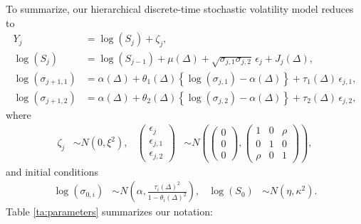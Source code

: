 \documentclass[10pt]{article}
\begin{document}
To summarize, our hierarchical discrete-time stochastic volatility model reduces to
\begin{align}
  Y_j &= \log(S_j) + \zeta_j  ,   \label{eq:mod1}   \\
  \log(S_{j}) &= \log(S_{j-1}) + \mu(\Delta) + \sqrt{\sigma_{j,1}\sigma_{j,2}} \, \epsilon_{j} + J_j(\Delta)   ,  \label{eq:mod2}  \\
  \log(\sigma_{j+1,1}) &= \alpha(\Delta) + \theta_1(\Delta) \left\{ \log(\sigma_{j,1}) - \alpha(\Delta) \right\} + \tau_1(\Delta) \, \epsilon_{j,1}    ,  \label{eq:mod3}  \\
  \log(\sigma_{j+1,2}) &= \alpha(\Delta) + \theta_2(\Delta) \left\{ \log(\sigma_{j,2}) - \alpha(\Delta) \right\} + \tau_2(\Delta) \, \epsilon_{j,2}    , \label{eq:mod4}
\end{align}
where
\begin{align*}
  \zeta_j &\sim N(0, \xi^2)  ,  &
                                  \left( \begin{matrix} \epsilon_{j} \\
      \epsilon_{j,1} \\ \epsilon_{j,2} \end{matrix} \right) &\sim
                                            N \left( \left(\begin{matrix} 0 \\ 0 \\
	                                          0 \end{matrix}
                                              \right) ,
  \left( \begin{matrix} 1 & 0 & \rho \\
      0 & 1 & 0 \\
    \rho & 0 & 1 \end{matrix} \right) \right)  ,
\end{align*}
and initial conditions
\begin{align*}
  \log(\sigma_{0,i}) & \sim N \left( \alpha , \frac{\tau_i(\Delta)^2}{1 - \theta_i(\Delta)^2} \right)  ,  &   \log(S_0) & \sim N \left( \eta, \kappa^2 \right)  .
\end{align*}
Table \ref{ta:parameters} summarizes our notation:
%
\end{document}
